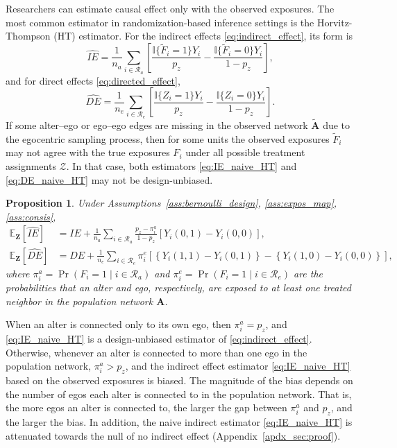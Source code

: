 \documentclass[11pt]{article}
\newtheorem{proposition}{Proposition}
\theoremstyle{definition}
\def \bZ {\boldsymbol{Z}}
\def \bA {\boldsymbol{A}}
\def \cR {\mathcal{R}}
\def \EX {\mathbb{E}}
\begin{document}
Researchers can estimate causal effect only with the observed exposures.
The most common estimator in randomization-based inference settings is the Horvitz-Thompson (HT) estimator.
For the indirect effects \eqref{eq:indirect_effect}, its form is
\begin{equation}
    \label{eq:IE_naive_HT}
    \widehat{IE} = 
    \frac{1}{n_a}
    \sum_{i \in \cR_a}
    \left[
    \frac{
    \mathbb{I}\{\widetilde{F}_i=1\}Y_i}{p_z} 
    -
    \frac{
    \mathbb{I}\{\widetilde{F}_i=0\}Y_i}{1 - p_z} 
    \right],
\end{equation}
and for direct effects \eqref{eq:directed_effect},
\begin{equation}
    \label{eq:DE_naive_HT}
    \widehat{DE} = 
    \frac{1}{n_e}
    \sum_{i \in \cR_e}
    \left[
    \frac{
    \mathbb{I}\{Z_i=1\}Y_i}{p_z} 
    -
    \frac{
    \mathbb{I}\{Z_i=0\}Y_i}{1 - p_z} 
    \right].
\end{equation}
If some alter--ego or ego--ego edges are missing in the observed network $\widetilde{\bA}$ due to the egocentric sampling process,
then for some units the observed exposures $\widetilde{F}_i$ may not agree with the true exposures $F_i$ under all possible treatment assignments $\mathcal{Z}$.
In that case, both estimators \eqref{eq:IE_naive_HT} and \eqref{eq:DE_naive_HT} may not be design-unbiased.
\begin{proposition}
    \label{prop:bias_naive_ht}
    Under Assumptions~\ref{ass:bernoulli_design}, \ref{ass:expos_map}, \ref{ass:consis},
    \begin{equation*}
        \begin{aligned}
        \EX_{\bZ}\left[\widehat{IE} \right] 
        &=
        IE + 
        \frac{1}{n_a} 
    \sum_{i\in\cR_a}
    \frac{p_z -\pi_i^a}{1-p_z}
    \left[
    Y_i(0, 1) - Y_i(0,0)
    \right],
    \\
      \EX_{\bZ}\left[\widehat{DE} \right] 
        &=
        DE + 
        \frac{1}{n_e} 
    \sum_{i\in\cR_e}
    \pi_i^e
    \left[
    \left\{ Y_i(1, 1) - Y_i(0,1)\right\} 
    - \left\{ Y_i(1,0) - Y_i(0,0) \right\}
    \right],
        \end{aligned}
    \end{equation*}
    where $\pi_i^a = \Pr(F_i=1\mid i\in \cR_a)$ and $\pi_i^e = \Pr(F_i=1 \mid i \in \cR_e)$ are the probabilities that an alter and ego, respectively, are exposed to at least one treated neighbor in the population network $\bA$.
\end{proposition}
When an alter is connected only to its own ego, then $\pi_i^a=p_z$, and \eqref{eq:IE_naive_HT}
 is a design-unbiased estimator of \eqref{eq:indirect_effect}.
Otherwise, whenever an alter is connected to more than one ego in the population network,
 $\pi_i^a > p_z$, and the indirect effect estimator \eqref{eq:IE_naive_HT} based on
  the observed exposures is biased. 
The magnitude of the bias depends on the number of egos each alter is connected to in the population network.
That is, the more egos an alter is connected to, the larger the gap between $\pi_i^a$ and $p_z$, and the larger the bias. 
In addition, the naive indirect estimator \eqref{eq:IE_naive_HT} is
attenuated towards the null of no indirect effect (Appendix~\ref{apdx_sec:proof}).
\end{document}
